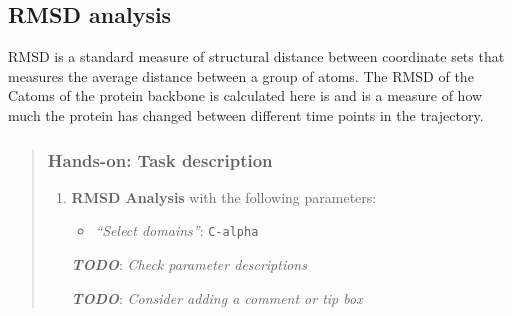 \documentclass[twocolumn]{bmcart}%
\providecommand{\tightlist}{%
  \setlength{\itemsep}{0pt}\setlength{\parskip}{0pt}}
\providecommand{\tightlist}{%
  \setlength{\itemsep}{0pt}\setlength{\parskip}{0pt}}
\begin{document}
\hypertarget{rmsd-analysis}{%
\subsection{RMSD analysis}\label{rmsd-analysis}}

RMSD is a standard measure of structural distance between coordinate
sets that measures the average distance between a group of atoms. The
RMSD of the C\alpha atoms of the protein backbone is calculated here is and
is a measure of how much the protein has changed between different time
points in the trajectory.

\begin{quote}
\hypertarget{hands-on-task-description-9}{%
\subsubsection{Hands-on: Task
description}\label{hands-on-task-description-9}}

\begin{enumerate}
\def\labelenumi{\arabic{enumi}.}
\tightlist
\item
  \textbf{RMSD Analysis} with the following parameters:

  \begin{itemize}
  \tightlist
  \item
    \emph{``Select domains''}: \texttt{C-alpha}
  \end{itemize}

  \textbf{\emph{TODO}}: \emph{Check parameter descriptions}

  \textbf{\emph{TODO}}: \emph{Consider adding a comment or tip box}
\end{enumerate}


\end{quote}
\end{document}
